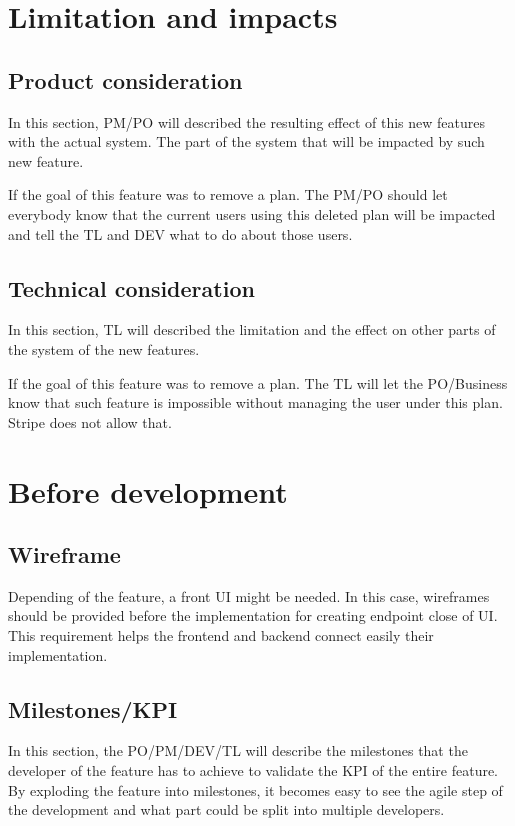 \documentclass[a4paper,article,oneside]{memoir}
\begin{document}
     \chapter{Limitation and impacts}
        \section{Product consideration}
        In this section, \gls{PM}/\gls{PO} will described the resulting effect of this new features with the actual system. The part of the system that will be impacted by such new feature.

\noindent{}

        If the goal of this feature was to remove a plan. The \gls{PM}/\gls{PO} should let everybody know that the current users using this deleted plan will be impacted and tell the \gls{TL} and \gls{DEV} what to do about those users. 
        \section{Technical consideration}
        In this section, \gls{TL} will described the limitation and the effect on other parts of the system of the new features.    

\noindent{}

        If the goal of this feature was to remove a plan. The \gls{TL} will let the \gls{PO}/\gls{Business} know that such feature is impossible without managing the user under this plan. Stripe does not allow that.
      \chapter{Before development}
      	\section{Wireframe}
      		Depending of the feature, a front UI might be needed. In this case, wireframes should be provided before the implementation for creating endpoint close of UI. This requirement helps the frontend and backend connect easily their implementation.
      	\section{Milestones/KPI}
      	In this section, the \gls{PO}/\gls{PM}/\gls{DEV}/\gls{TL} will describe the milestones that the developer of the feature has to achieve to validate the KPI of the entire feature. By exploding the feature into milestones, it becomes easy to see the agile step of the development and what part could be split into multiple developers.
\end{document}
